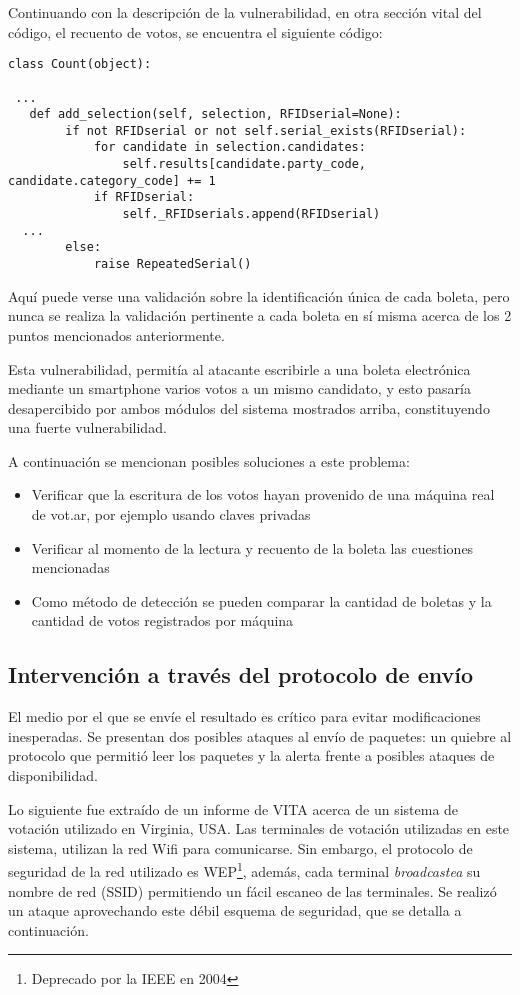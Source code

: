 Continuando con la descripción de la vulnerabilidad, en otra sección vital del código, el recuento de votos, se encuentra el siguiente código:

\begin{lstlisting}
class Count(object):

 ...
   def add_selection(self, selection, RFIDserial=None):
        if not RFIDserial or not self.serial_exists(RFIDserial):
            for candidate in selection.candidates:
                self.results[candidate.party_code, candidate.category_code] += 1
            if RFIDserial:
                self._RFIDserials.append(RFIDserial)
  ...
        else:
            raise RepeatedSerial()
\end{lstlisting}

Aquí puede verse una validación sobre la identificación única de cada boleta, pero nunca se realiza la validación pertinente a cada boleta en sí misma acerca de los 2 puntos mencionados anteriormente.

Esta vulnerabilidad, permitía al atacante escribirle a una boleta electrónica mediante un smartphone varios votos a un mismo candidato, y esto pasaría desapercibido por ambos módulos del sistema mostrados arriba, constituyendo una fuerte vulnerabilidad.

A continuación se mencionan posibles soluciones a este problema:
\begin{itemize}
	\item Verificar que la escritura de los votos hayan provenido de una máquina real de vot.ar, por ejemplo usando claves privadas
	\item Verificar al momento de la lectura y recuento de la boleta las cuestiones mencionadas
	\item Como método de detección se pueden comparar la cantidad de boletas y la cantidad de votos registrados por máquina
\end{itemize}


\subsection{Intervención a través del protocolo de envío}

El medio por el que se envíe el resultado es crítico para evitar modificaciones inesperadas. Se presentan dos posibles ataques al envío de paquetes: un quiebre al protocolo que permitió leer los paquetes y la alerta frente a posibles ataques de disponibilidad.

Lo siguiente fue extraído de un informe de VITA acerca de un sistema de votación utilizado en Virginia, USA\cite{vita}.
Las terminales de votación utilizadas en este sistema, utilizan la red Wifi para comunicarse. Sin embargo, el protocolo de seguridad de la red utilizado es WEP\footnote{Deprecado por la IEEE en 2004}, además, cada terminal \textit{broadcastea} su nombre de red (SSID) permitiendo un fácil escaneo de las terminales. Se realizó un ataque aprovechando este débil esquema de seguridad, que se detalla a continuación.

